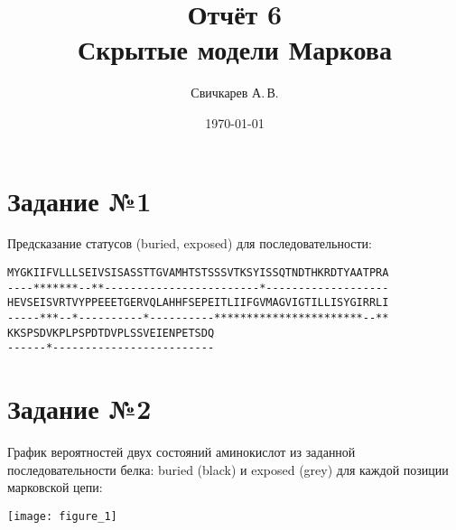 \documentclass{article} %
\title{Отчёт 6\protect\\Скрытые модели Маркова} %
\author{Свичкарев А.\,В.} %
\date{\today} %
\begin{document}

\maketitle %

\section{Задание №1}
Предсказание статусов (buried, exposed) для последовательности:

\begin{verbatim}
MYGKIIFVLLLSEIVSISASSTTGVAMHTSTSSSVTKSYISSQTNDTHKRDTYAATPRA
----*******--**------------------------*-------------------
HEVSEISVRTVYPPEEETGERVQLAHHFSEPEITLIIFGVMAGVIGTILLISYGIRRLI
-----***--*----------*----------***********************--**
KKSPSDVKPLPSPDTDVPLSSVEIENPETSDQ
------*-------------------------
\end{verbatim}

\section{Задание №2}
График вероятностей двух состояний аминокислот из заданной последовательности белка: buried (black) и exposed (grey) для каждой позиции марковской цепи:

\texttt{[image: figure\_1]}
\end{document}
